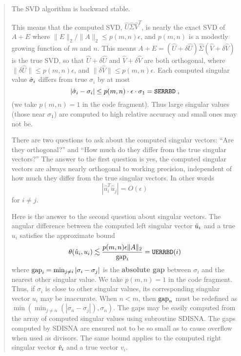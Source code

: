 \begin{quote}
The SVD algorithm is backward stable.

This means that the computed SVD, $\hat{U} \hat{\Sigma} \hat{V}^T$,
is nearly the exact SVD of $A+E$ where $\|E\|_2 / \|A\|_2 \leq p(m,n) \epsilon$,
and $p(m,n)$ is a modestly growing function of $m$ and $n$. This means
$A+E = (\hat{U} + \delta \hat{U}) \hat{\Sigma} (\hat{V}+ \delta \hat{V})$
is the true SVD, so that $\hat{U}+ \delta \hat{U}$ and $\hat{V}+ \delta
\hat{V}$ are both orthogonal, where
$\| \delta \hat{U} \| \leq p(m,n) \epsilon$, and
$\| \delta \hat{V} \| \leq p(m,n) \epsilon$.
Each computed singular value $\hat{\sigma}_i$ differs from true $\sigma_i$
by at most
\[
| \hat{\sigma}_i - \sigma_i | \leq p(m,n) \cdot \epsilon \cdot \sigma_1
= {\tt SERRBD} \; ,
\]
(we take $p(m,n)=1$ in the code fragment).
Thus large singular values (those near $\sigma_1$) are computed to
high relative accuracy  and small ones may not be.

There are two questions to ask about the computed singular vectors:
``Are they orthogonal?'' and ``How much do they differ from the
true singular vectors?''
The answer to the first question is yes,
the computed singular vectors
are always nearly orthogonal to working precision, independent of
how much they differ from the true singular vectors. In other words
\[
|\hat{u}_i^T \hat{u}_j | = O( \epsilon )
\]
for $i \neq j$.

Here is the answer to the second question about singular vectors.
The angular difference between the computed left singular vector $\hat{u}_i$
and a true $u_i$ satisfies the approximate bound
\[
\theta ( \uhat_i , u_i ) \leapproxeq \frac{p(m,n) \epsilon \|A\|_2}{\gap_i}
= {\tt UERRBD}(i)
\]
where ${\rm gap}_i = \min_{j \neq i} | \sigma_i - \sigma_j |$ is the
{\bf absolute gap}
between $\sigma_i$ and the nearest other singular value.
We take $p(m,n)=1$ in the code fragment.
Thus, if $\sigma_i$
is close to other singular values, its corresponding singular vector $u_i$
may be inaccurate. When $n < m$, then ${\rm gap}_n$ must be redefined
as $\min ( \min_{j \neq n} ( | \sigma_n - \sigma_j | ), \sigma_n )$.
The gaps may be easily computed from the array of computed singular values
using subroutine SDISNA.
The gaps computed by SDISNA are ensured not to be so small as
to cause overflow when used as divisors.
The same bound applies to the computed right singular
vector $\hat{v}_i$ and a true vector $v_i$.


\end{quote}
